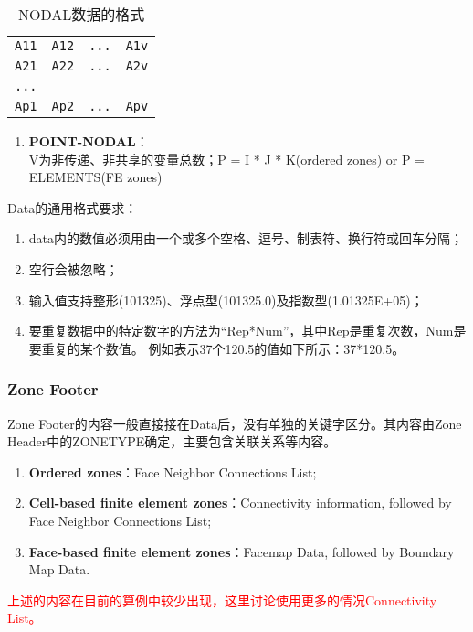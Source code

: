 \documentclass[lang=cn,11pt,a4paper]{elegantpaper}
\begin{document}
\begin{table}[!htb]
  \centering
  \caption{NODAL数据的格式}
  \label{nodal}
  \begin{tabular}{*{4}{c}}
   \hline
   \texttt{A11} & \texttt{A12} & \texttt{...}  & \texttt{A1v} \\
   \texttt{A21} & \texttt{A22} & \texttt{...} & \texttt{A2v} \\
   \texttt{...} & \texttt{~} & \texttt{~} & \texttt{~} \\
   \texttt{Ap1} & \texttt{Ap2} & \texttt{...} & \texttt{Apv} \\
   \hline
  \end{tabular}
\end{table}

\begin{enumerate}
  \item \textbf{POINT-NODAL}：\\
  V为非传递、非共享的变量总数；P = I * J * K(ordered zones) or P = ELEMENTS(FE zones)
\end{enumerate}

Data的通用格式要求：
\begin{enumerate}
  \item data内的数值必须用由一个或多个空格、逗号、制表符、换行符或回车分隔；
  \item 空行会被忽略；
  \item 输入值支持整形(101325)、浮点型(101325.0)及指数型(1.01325E+05)；
  \item 要重复数据中的特定数字的方法为“Rep*Num”，其中Rep是重复次数，Num是要重复的某个数值。
        例如表示37个120.5的值如下所示：37*120.5。
\end{enumerate}

\subsubsection{Zone Footer}\label{zoneFooter}
Zone Footer的内容一般直接接在Data后，没有单独的关键字区分。其内容由Zone Header中的ZONETYPE确定，主要包含关联关系等内容。
\begin{enumerate}
  \item \textbf{Ordered zones}：Face Neighbor Connections List;
  \item \textbf{Cell-based finite element zones}：Connectivity information, followed by Face Neighbor Connections List;
  \item \textbf{Face-based finite element zones}：Facemap Data, followed by Boundary Map Data.
\end{enumerate}
\textcolor{red}{上述的内容在目前的算例中较少出现，这里讨论使用更多的情况Connectivity List。}
\end{document}
